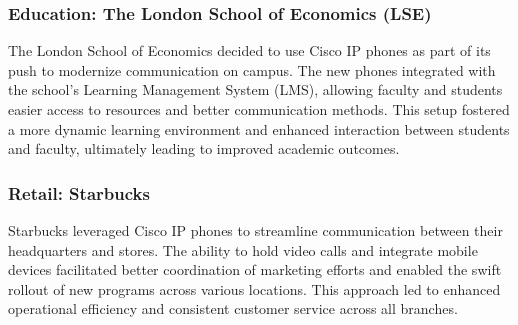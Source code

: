 \documentclass[11pt,a4paper]{article}
\begin{document}
\subsubsection*{Education: The London School of Economics (LSE)}

The London School of Economics decided to use Cisco IP phones as part of its push to modernize communication on campus. The new phones integrated with the school’s Learning Management System (LMS), allowing faculty and students easier access to resources and better communication methods. This setup fostered a more dynamic learning environment and enhanced interaction between students and faculty, ultimately leading to improved academic outcomes.


\subsubsection*{Retail: Starbucks}

Starbucks leveraged Cisco IP phones to streamline communication between their headquarters and stores. The ability to hold video calls and integrate mobile devices facilitated better coordination of marketing efforts and enabled the swift rollout of new programs across various locations. This approach led to enhanced operational efficiency and consistent customer service across all branches.
\end{document}
